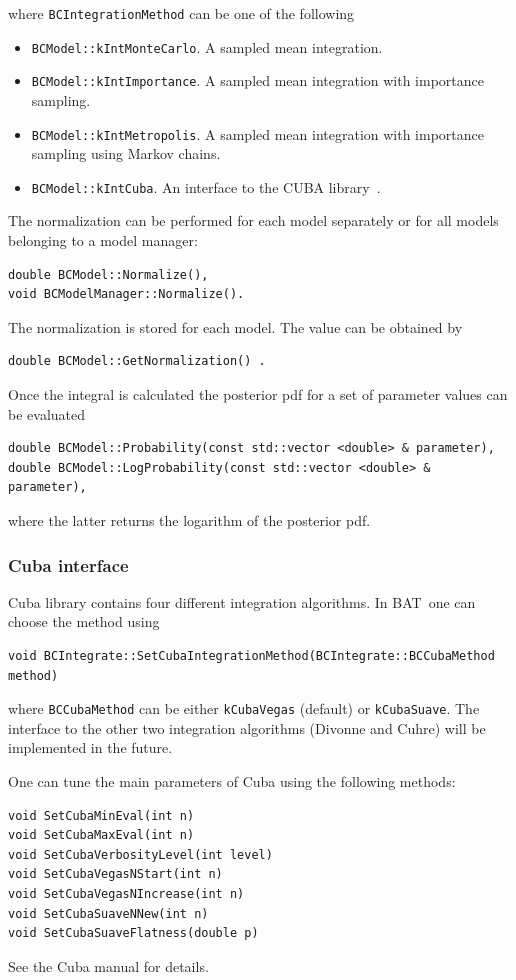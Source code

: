 \documentclass[11pt, a4paper]{article}
\newcommand{\bat}{{\sc BAT}}
\newcommand{\BAT}{\bat}
\begin{document}
where \verb|BCIntegrationMethod| can be one of the following
%
\begin{itemize}
\item \verb|BCModel::kIntMonteCarlo|. A sampled mean integration.
\item \verb|BCModel::kIntImportance|. A sampled mean integration
 with importance sampling.
\item \verb|BCModel::kIntMetropolis|. A sampled mean integration
 with importance sampling using Markov chains.
\item \verb|BCModel::kIntCuba|. An interface to the CUBA
  library~\cite{CUBA,CUBAweb}.
\end{itemize}
%

The normalization can be performed for each model separately or for
all models belonging to a model manager:
%
\begin{verbatim}
double BCModel::Normalize(),
void BCModelManager::Normalize().
\end{verbatim}
%
The normalization is stored for each model. The value can be obtained
by
%
\begin{verbatim}
double BCModel::GetNormalization() .
\end{verbatim}

Once the integral is calculated the posterior pdf for a set of
parameter values can be evaluated
%
\begin{verbatim}
double BCModel::Probability(const std::vector <double> & parameter),
double BCModel::LogProbability(const std::vector <double> & parameter),
\end{verbatim}
%
where the latter returns the logarithm of the posterior pdf.

\subsubsection{Cuba interface}
\label{section:cubainterface}

Cuba library contains four different integration algorithms. In \BAT\
one can choose the method using
%
\begin{verbatim}
void BCIntegrate::SetCubaIntegrationMethod(BCIntegrate::BCCubaMethod method)
\end{verbatim}
%
where \verb|BCCubaMethod| can be either \verb|kCubaVegas| (default)
or \verb|kCubaSuave|. The interface to the other two integration
algorithms (Divonne and Cuhre) will be implemented in the future.

One can tune the main parameters of Cuba using the following methods:
%
\begin{verbatim}
void SetCubaMinEval(int n)
void SetCubaMaxEval(int n)
void SetCubaVerbosityLevel(int level)
void SetCubaVegasNStart(int n)
void SetCubaVegasNIncrease(int n)
void SetCubaSuaveNNew(int n)
void SetCubaSuaveFlatness(double p)
\end{verbatim}
%
See the Cuba manual for details.
\end{document}
